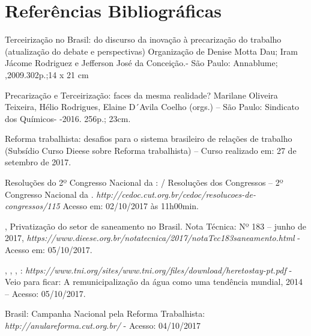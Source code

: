 
\section{Referências Bibliográficas}

\begin{Parskip}
Terceirização no Brasil: do discurso da inovação à precarização do
trabalho (atualização do debate e perspectivas) Organização de Denise
Motta Dau; Iram Jácome Rodriguez e Jefferson José da Conceição.- São
Paulo: Annablume; ,2009.302p.;14 x 21 cm

Precarização e Terceirização: faces da mesma realidade? Marilane
Oliveira Teixeira, Hélio Rodrigues, Elaine D´Avila Coelho (orgs.) -- São
Paulo: Sindicato dos Químicos- -2016. 256p.; 23cm.

 Reforma trabalhista: desafios para o sistema brasileiro de relações de
trabalho (Subsídio Curso Dieese sobre Reforma trabalhista) -- Curso
realizado em: 27 de setembro de 2017.

 Resoluções do 2º Congresso Nacional da : / Resoluções dos
Congressos -- 2º Congresso Nacional da .
\emph{http://cedoc.cut.org.br/cedoc/resolucoes-de-congressos/115}
Acesso em: 02/10/2017 às 11h00min.

 , Privatização do setor de saneamento no Brasil. Nota Técnica:
Nº 183 -- junho de 2017,
\emph{https://www.dieese.org.br/notatecnica/2017/notaTec183saneamento.html}
- Acesso em: 05/10/2017.

 ,   , ,  :
\emph{https://www.tni.org/sites/www.tni.org/files/download/heretostay-pt.pdf}
- Veio para ficar: A remunicipalização da água como uma tendência
mundial, 2014 -- Acesso: 05/10/2017.

  Brasil: Campanha Nacional pela Reforma Trabalhista:
\emph{http://anulareforma.cut.org.br/}
- Acesso: 04/10/2017
\end{Parskip}